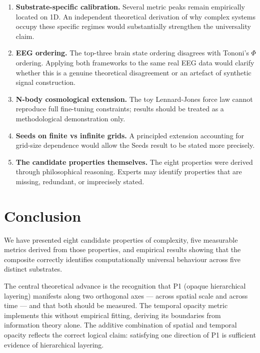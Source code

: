 \documentclass[12pt,a4paper]{article}
\begin{document}
\begin{enumerate}[noitemsep]
  \item \textbf{Substrate-specific calibration.}
    Several metric peaks remain empirically located on 1D.
    An independent theoretical derivation of why complex systems
    occupy these specific regimes would substantially strengthen the
    universality claim.

  \item \textbf{EEG ordering.}
    The top-three brain state ordering disagrees with Tononi's $\Phi$
    ordering.
    Applying both frameworks to the same real EEG data would clarify
    whether this is a genuine theoretical disagreement or an artefact
    of synthetic signal construction.

  \item \textbf{N-body cosmological extension.}
    The toy Lennard-Jones force law cannot reproduce full fine-tuning
    constraints; results should be treated as a methodological
    demonstration only.

  \item \textbf{Seeds on finite vs infinite grids.}
    A principled extension accounting for grid-size dependence would
    allow the Seeds result to be stated more precisely.

  \item \textbf{The candidate properties themselves.}
    The eight properties were derived through philosophical reasoning.
    Experts may identify properties that are missing, redundant, or
    imprecisely stated.
\end{enumerate}

\section{Conclusion}

We have presented eight candidate properties of complexity, five
measurable metrics derived from those properties, and empirical
results showing that the composite correctly identifies
computationally universal behaviour across five distinct substrates.

The central theoretical advance is the recognition that P1 (opaque
hierarchical layering) manifests along two orthogonal axes --- across
spatial scale and across time --- and that both should be measured.
The temporal opacity metric implements this without empirical fitting,
deriving its boundaries from information theory alone.
The additive combination of spatial and temporal opacity reflects the
correct logical claim: satisfying one direction of P1 is sufficient
evidence of hierarchical layering.
\end{document}
